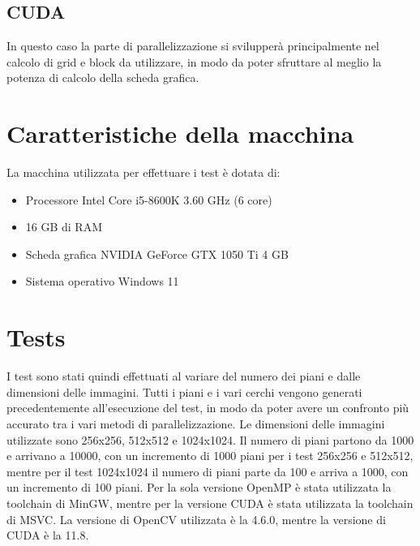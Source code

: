 \documentclass[11pt]{article}
\begin{document}
    \subsection{CUDA}\label{subsec:cuda}
    In questo caso la parte di parallelizzazione si svilupperà principalmente nel calcolo di grid e block da utilizzare,
    in modo da poter sfruttare al meglio la potenza di calcolo della scheda grafica.
    

    \section{Caratteristiche della macchina}\label{sec:caratteristiche-della-macchina}
    La macchina utilizzata per effettuare i test è dotata di:
    \begin{itemize}
        \item Processore Intel Core i5-8600K 3.60 GHz (6 core)
        \item 16 GB di RAM
        \item Scheda grafica NVIDIA GeForce GTX 1050 Ti 4 GB
        \item Sistema operativo Windows 11
    \end{itemize}

    \section{Tests}\label{sec:tests}
    I test sono stati quindi effettuati al variare del numero dei piani e dalle dimensioni delle immagini.
    Tutti i piani e i vari cerchi vengono generati precedentemente all'esecuzione del test, in modo da poter avere
    un confronto più accurato tra i vari metodi di parallelizzazione.
    Le dimensioni delle immagini utilizzate sono 256x256, 512x512 e 1024x1024.
    Il numero di piani partono da 1000 e arrivano a 10000, con un incremento di 1000 piani per i test 256x256 e 512x512,
    mentre per il test 1024x1024 il numero di piani parte da 100 e arriva a 1000, con un incremento di 100 piani.
    Per la sola versione OpenMP è stata utilizzata la toolchain di MinGW, mentre per la versione CUDA è stata utilizzata
    la toolchain di MSVC\@.
    La versione di OpenCV utilizzata è la 4.6.0, mentre la versione di CUDA è la 11.8.
\end{document}
